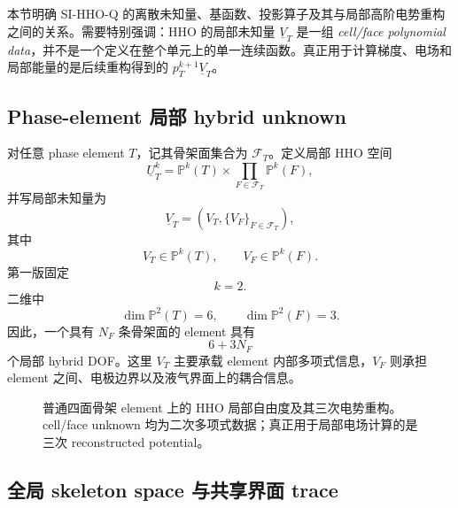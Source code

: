 \documentclass[UTF8,a4paper,11pt]{ctexart}
\newcommand{\Pp}{\mathbb{P}}
\newcommand{\vct}[1]{\bm{#1}}
\begin{document}
本节明确 SI-HHO-Q 的离散未知量、基函数、投影算子及其与局部高阶电势重构之间的关系。需要特别强调：HHO 的局部未知量
\(\underline V_T\) 是一组 \emph{cell/face polynomial data}，并不是一个定义在整个单元上的单一连续函数。真正用于计算梯度、电场和局部能量的是后续重构得到的 \(p_T^{k+1}\underline V_T\)。

\subsection{Phase-element 局部 hybrid unknown}

对任意 phase element \(T\)，记其骨架面集合为 \(\mathcal F_T\)。定义局部 HHO 空间
\begin{equation}
\boxed{
\underline U_T^k
=
\Pp^k(T)\times\prod_{F\in\mathcal F_T}\Pp^k(F),
}
\label{eq:local_hho_space}
\end{equation}
并写局部未知量为
\begin{equation}
\underline V_T
=
\left(V_T,\{V_F\}_{F\in\mathcal F_T}\right),
\label{eq:local_unknown}
\end{equation}
其中
\[
V_T\in\Pp^k(T),\qquad
V_F\in\Pp^k(F).
\]
第一版固定
\[
\boxed{k=2}.
\]
二维中
\[
\dim\Pp^2(T)=6,\qquad
\dim\Pp^2(F)=3.
\]
因此，一个具有 \(N_F\) 条骨架面的 element 具有
\[
6+3N_F
\]
个局部 hybrid DOF。这里 \(V_T\) 主要承载 element 内部多项式信息，\(V_F\) 则承担 element 之间、电极边界以及液气界面上的耦合信息。

\begin{figure}[htbp]
\centering
{}
\caption{普通四面骨架 element 上的 HHO 局部自由度及其三次电势重构。cell/face unknown 均为二次多项式数据；真正用于局部电场计算的是三次 reconstructed potential。}
\label{fig:hho_local_dofs}
\end{figure}

\subsection{全局 skeleton space 与共享界面 trace}
\end{document}
